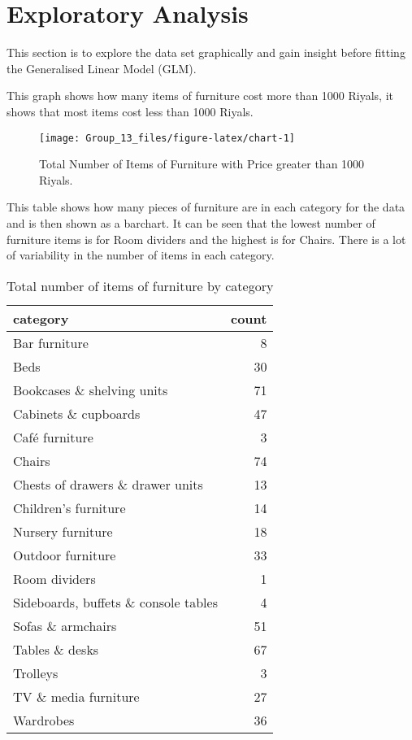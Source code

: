 \documentclass[
]{article}
\begin{document}
\hypertarget{sec:exploratory}{%
\section{Exploratory Analysis}\label{sec:exploratory}}

This section is to explore the data set graphically and gain insight
before fitting the Generalised Linear Model (GLM).

This graph shows how many items of furniture cost more than 1000 Riyals,
it shows that most items cost less than 1000 Riyals.

\begin{figure}[H]

{\centering \texttt{[image: Group\_13\_files/figure-latex/chart-1]} 

}

\caption{\label{fig:barchart1} Total Number of Items of Furniture with Price greater than 1000 Riyals.}\label{fig:chart}
\end{figure}

This table shows how many pieces of furniture are in each category for
the data and is then shown as a barchart. It can be seen that the lowest
number of furniture items is for Room dividers and the highest is for
Chairs. There is a lot of variability in the number of items in each
category.

\begin{table}[!h]

\caption{\label{tab:table1}\label{tab:table1} Total number of items of furniture by category}
\centering
\fontsize{8}{10}\selectfont
\begin{tabular}[t]{l|r}
\hline
category & count\\
\hline
Bar furniture & 8\\
\hline
Beds & 30\\
\hline
Bookcases \& shelving units & 71\\
\hline
Cabinets \& cupboards & 47\\
\hline
Café furniture & 3\\
\hline
Chairs & 74\\
\hline
Chests of drawers \& drawer units & 13\\
\hline
Children's furniture & 14\\
\hline
Nursery furniture & 18\\
\hline
Outdoor furniture & 33\\
\hline
Room dividers & 1\\
\hline
Sideboards, buffets \& console tables & 4\\
\hline
Sofas \& armchairs & 51\\
\hline
Tables \& desks & 67\\
\hline
Trolleys & 3\\
\hline
TV \& media furniture & 27\\
\hline
Wardrobes & 36\\
\hline
\end{tabular}
\end{table}
\end{document}
